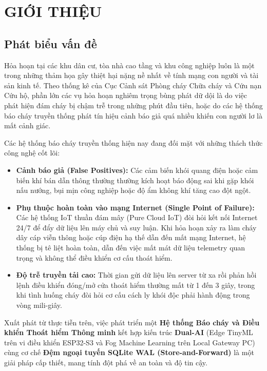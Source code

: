 \section{GIỚI THIỆU}

\subsection{Phát biểu vấn đề}
Hỏa hoạn tại các khu dân cư, tòa nhà cao tầng và khu công nghiệp luôn là một trong những thảm họa gây thiệt hại nặng nề nhất về tính mạng con người và tài sản kinh tế. Theo thống kê của Cục Cảnh sát Phòng cháy Chữa cháy và Cứu nạn Cứu hộ, phần lớn các vụ hỏa hoạn nghiêm trọng bùng phát dữ dội là do việc phát hiện đám cháy bị chậm trễ trong những phút đầu tiên, hoặc do các hệ thống báo cháy truyền thống phát tín hiệu cảnh báo giả quá nhiều khiến con người lơ là mất cảnh giác.

Các hệ thống báo cháy truyền thống hiện nay đang đối mặt với những thách thức công nghệ cốt lõi:
\begin{itemize}
    \item \textbf{Cảnh báo giả (False Positives):} Các cảm biến khói quang điện hoặc cảm biến khí bán dẫn thông thường thường kích hoạt báo động sai khi gặp khói nấu nướng, bụi mịn công nghiệp hoặc độ ẩm không khí tăng cao đột ngột.
    \item \textbf{Phụ thuộc hoàn toàn vào mạng Internet (Single Point of Failure):} Các hệ thống IoT thuần đám mây (Pure Cloud IoT) đòi hỏi kết nối Internet 24/7 để đẩy dữ liệu lên máy chủ và suy luận. Khi hỏa hoạn xảy ra làm cháy dây cáp viễn thông hoặc cúp điện hạ thế dẫn đến mất mạng Internet, hệ thống bị tê liệt hoàn toàn, dẫn đến việc mất mát dữ liệu telemetry quan trọng và không thể điều khiển cơ cấu thoát hiểm.
    \item \textbf{Độ trễ truyền tải cao:} Thời gian gửi dữ liệu lên server từ xa rồi phản hồi lệnh điều khiển đóng/mở cửa thoát hiểm thường mất từ 1 đến 3 giây, trong khi tình huống cháy đòi hỏi cơ cấu cách ly khói độc phải hành động trong vòng mili-giây.
\end{itemize}

Xuất phát từ thực tiễn trên, việc phát triển một \textbf{Hệ thống Báo cháy và Điều khiển Thoát hiểm Thông minh} kết hợp kiến trúc \textbf{Dual-AI} (Edge TinyML trên vi điều khiển ESP32-S3 và Fog Machine Learning trên Local Gateway PC) cùng cơ chế \textbf{Đệm ngoại tuyến SQLite WAL (Store-and-Forward)} là một giải pháp cấp thiết, mang tính đột phá về an toàn và độ tin cậy.

